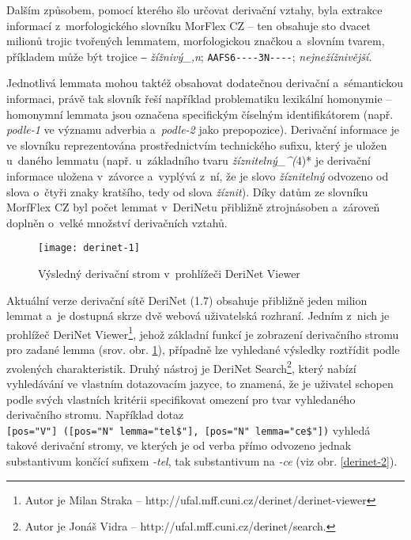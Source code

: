 Dalším způsobem, pomocí kterého šlo určovat derivační vztahy, byla
extrakce informací z~morfologického slovníku MorFlex CZ -- ten obsahuje
sto dvacet milionů trojic tvořených lemmatem, morfologickou značkou
a~slovním tvarem, příkladem může být trojice ‒ \emph{žížnivý\_,n};
\texttt{AAFS6-\/-\/-\/-3N-\/-\/-\/-}; \emph{nejnežížnivější}.
\parencite{morflex}

Jednotlivá lemmata mohou taktéž obsahovat dodatečnou derivační
a~sémantickou informaci, právě tak slovník řeší například problematiku
lexikální homonymie -- homonymní lemmata jsou označena specifickým
číselným identifikátorem (např. \emph{podle-1} ve významu adverbia
a~\emph{podle-2} jako prepopozice). Derivační informace je ve slovníku
reprezentována prostřednictvím technického sufixu, který je uložen
u~daného lemmatu (např. u~základního tvaru \emph{žíznitelný\_\^{}(}4)* je
derivační informace uložena v~závorce a~vyplývá z~ní, že je slovo
\emph{žíznitelný} odvozeno od slova o~čtyři znaky kratšího, tedy od
slova \emph{žíznit}). Díky datům ze slovníku MorfFlex CZ byl počet
lemmat v~DeriNetu přibližně ztrojnásoben a~zároveň doplněn o~velké
množství derivačních vztahů.~\parencite{sevcikova16}

\begin{figure}[ht]   
    \centering
    \texttt{[image: derinet-1]}  
    \caption{Výsledný derivační strom v~prohlížeči DeriNet Viewer~\parencite{derinet}}
    \label{derinet-1}
 \end{figure}

Aktuální verze derivační sítě DeriNet (1.7) obsahuje přibližně jeden
milion lemmat a~je dostupná skrze dvě webová uživatelská rozhraní.
Jedním z~nich je prohlížeč DeriNet
Viewer\footnote{Autor je Milan Straka -- http://ufal.mff.cuni.cz/derinet/derinet-viewer},
jehož základní funkcí je zobrazení derivačního stromu pro zadané lemma
(srov. obr. \ref{derinet-1}), případně lze vyhledané výsledky roztřídit
podle zvolených charakteristik. Druhý nástroj je DeriNet
Search\footnote{Autor je Jonáš Vidra -- http://ufal.mff.cuni.cz/derinet/search.},
který nabízí vyhledávání ve vlastním dotazovacím jazyce, to znamená, že
je uživatel schopen podle svých vlastních kritérii specifikovat omezení
pro tvar vyhledaného derivačního stromu. Například dotaz
\texttt{{[}pos="V"{]}\ ({[}pos="N"\ lemma="tel\$"{]},\ {[}pos="N"\ lemma="ce\$"{]})}
vyhledá takové derivační stromy, ve kterých je od verba přímo odvozeno
jednak substantivum končící sufixem \emph{-tel}, tak substantivum na
\emph{-ce} (viz obr. \ref{derinet-2}).~\parencite{derinet-cz}

